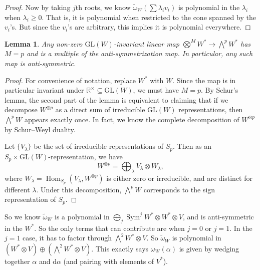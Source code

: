 \documentclass{shortart}
\newtheorem{lemma}[thm]{Lemma}
\theoremstyle{definition}
\DeclareMathOperator\Hom{Hom}
\DeclareMathOperator\Sym{Sym}
\newcommand\GL{\mathrm{GL}}
\newcommand\R{\mathbb{R}}
\newcommand\exterior{{\textstyle \bigwedge}}
\renewcommand\d{\mathrm{d}}
\begin{document}
\begin{proof}
  Now by taking $j$th roots, we know $\tilde{\omega}_W(\sum \lambda_i v_i)$ is polynomial in the $\lambda_i$ when $\lambda_i \geq 0$. That is, it is polynomial when restricted to the cone spanned by the $v_i$'s. But since the $v_i$'s are arbitrary, this implies it is polynomial everywhere.
\end{proof}

\begin{lemma}
  Any non-zero $\GL(W)$-invariant linear map $\bigotimes^M W^* \to \exterior^p W^*$ has $M = p$ and is a multiple of the anti-symmetrization map. In particular, any such map is anti-symmetric.
\end{lemma}

\begin{proof}
  For convenience of notation, replace $W^*$ with $W$. Since the map is in particular invariant under $\R^\times \subseteq \GL(W)$, we must have $M = p$. By Schur's lemma, the second part of the lemma is equivalent to claiming that if we decompose $W^{\otimes p}$ as a direct sum of irreducible $\GL(W)$ representations, then $\exterior^p W$ appears exactly once. In fact, we know the complete decomposition of $W^{\otimes p}$ by Schur--Weyl duality.

  Let $\{V_\lambda\}$ be the set of irreducible representations of $S_p$. Then as an $S_p \times \GL(W)$-representation, we have
  \[
    W^{\otimes p} = \bigoplus_\lambda V_\lambda \otimes W_\lambda,
  \]
  where $W_\lambda = \Hom_{S_p} (V_\lambda, W^{\otimes p})$ is either zero or irreducible, and are distinct for different $\lambda$. Under this decomposition, $\exterior^p W$ corresponds to the sign representation of $S_p$.
\end{proof}

So we know $\tilde{\omega}_W$ is a polynomial in $\bigoplus_j \Sym^j W^* \otimes W^* \otimes V$, and is anti-symmetric in the $W^*$. So the only terms that can contribute are when $j = 0$ or $j = 1$. In the $j = 1$ case, it has to factor through $\exterior^2 W^* \otimes V$. So $\tilde{\omega}_W$ is polynomial in $(W^* \otimes V) \oplus (\exterior^2 W^* \otimes V)$. This exactly says $\omega_W(\alpha)$ is given by wedging together $\alpha$ and $\d \alpha$ (and pairing with elements of $V^*$).
\end{document}
